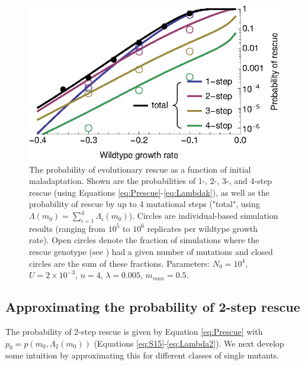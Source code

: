 \documentclass[9pt,twocolumn,twoside,lineno]{gsajnl}
\begin{document}
\begin{figure}[htb]
\centering
\includegraphics[width=\linewidth]{Figure3.eps}
\caption{
The probability of evolutionary rescue as a function of initial maladaptation.
Shown are the probabilities of 1-, 2-, 3-, and 4-step rescue (using Equations \ref{eq:Prescue}-\ref{eq:Lambdak}), as well as the probability of rescue by up to 4 mutational steps ("total", using $\Lambda(m_0) = \sum_{i=1}^4 \Lambda_i(m_0)$).
Circles are individual-based simulation results (ranging from $10^5$ to $10^6$ replicates per wildtype growth rate).
Open circles denote the fraction of simulations where the rescue genotype (see ) had a given number of mutations and closed circles are the sum of these fractions.
Parameters: $N_0=10^4$, $U=2\times10^{-3}$, $n=4$, $\lambda=0.005$, $m_{max}=0.5$.
}%
\label{fig:1vs2m0}
\end{figure}

\subsection{Approximating the probability of 2-step rescue}
\label{sec:approx2step}

The probability of 2-step rescue is given by Equation \ref{eq:Prescue} with $p_0=p(m_0,\Lambda_2(m_0))$ (Equations \ref{eq:S15}-\ref{eq:Lambda2}).
We next develop some intuition by approximating this for different classes of single mutants.
\end{document}
